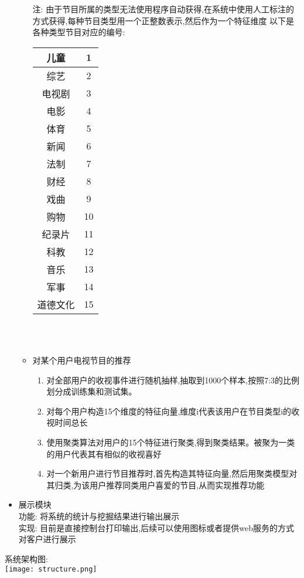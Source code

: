 \documentclass{hitreport}
\begin{document}
\begin{itemize}
\begin{itemize}
                注: 由于节目所属的类型无法使用程序自动获得,在系统中使用人工标注的方式获得,每种节目类型用一个正整数表示,然后作为一个特征维度
                以下是各种类型节目对应的编号:
                ~\\
                \begin{tabular}{|c|c|}
                  \hline
                  儿童     & 1  \\ \hline
                  综艺     & 2  \\ \hline
                  电视剧   & 3  \\ \hline
                  电影     & 4  \\ \hline
                  体育     & 5  \\ \hline
                  新闻     & 6  \\ \hline
                  法制     & 7  \\ \hline
                  财经     & 8  \\ \hline
                  戏曲     & 9  \\ \hline
                  购物     & 10 \\ \hline
                  纪录片   & 11 \\ \hline
                  科教     & 12 \\ \hline
                  音乐     & 13 \\ \hline
                  军事     & 14 \\ \hline
                  道德文化 & 15 \\ \hline
                \end{tabular}\\
                ~\\
          \item 对某个用户电视节目的推荐
                \begin{enumerate}
                  \item 对全部用户的收视事件进行随机抽样,抽取到1000个样本,按照7:3的比例划分成训练集和测试集。
                  \item 对每个用户构造15个维度的特征向量,维度i代表该用户在节目类型i的收视时间总长
                  \item 使用聚类算法对用户的15个特征进行聚类,得到聚类结果。被聚为一类的用户代表其有相似的收视喜好
                  \item 对一个新用户进行节目推荐时,首先构造其特征向量,然后用聚类模型对其归类,为该用户推荐同类用户喜爱的节目,从而实现推荐功能
                \end{enumerate}
        \end{itemize}
  \item 展示模块\\
        功能: 将系统的统计与挖掘结果进行输出展示\\
        实现: 目前是直接控制台打印输出,后续可以使用图标或者提供web服务的方式对客户进行展示
\end{itemize}
系统架构图:\\
\texttt{[image: structure.png]}
\end{document}
